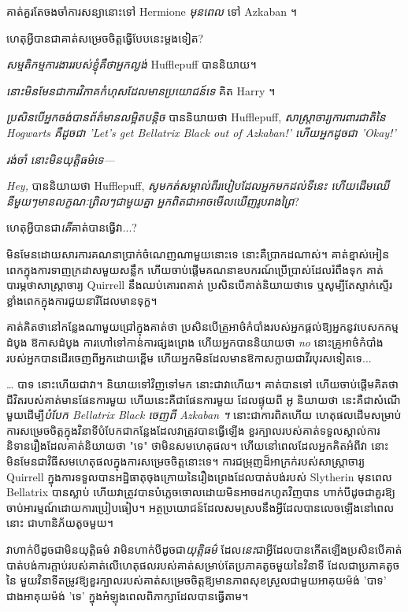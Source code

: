 {{{{{{{គាត់គួរតែចងចាំការសន្យានោះទៅ Hermione \emph{មុនពេល} ទៅ Azkaban ។

ហេតុអ្វីបានជាគាត់សម្រេចចិត្តធ្វើបែបនេះម្តងទៀត?

\emph{សម្មតិកម្មការងាររបស់ខ្ញុំគឺថាអ្នកល្ងង់} Hufflepuff បាននិយាយ។

\emph{នោះមិនមែនជាការវិភាគកំហុសដែលមានប្រយោជន៍ទេ} គិត Harry ។

\emph{ប្រសិនបើអ្នកចង់បានព័ត៌មានលម្អិតបន្តិច} បាននិយាយថា Hufflepuff, \emph{សាស្រ្តាចារ្យការពារជាតិនៃ Hogwarts គឺដូចជា 'Let's get Bellatrix Black out of Azkaban!' ហើយអ្នកដូចជា 'Okay!'}

\emph{រង់ចាំ \emph{នោះ}មិនយុត្តិធម៌ទេ—}

\emph{Hey,} បាននិយាយថា Hufflepuff, \emph{សូមកត់សម្គាល់ពីរបៀបដែលអ្នកមកដល់ទីនេះ ហើយដើមឈើនីមួយៗមានលក្ខណៈព្រិលៗជាមួយគ្នា អ្នកពិតជាអាចមើលឃើញរូបរាងព្រៃ}?

ហេតុអ្វីបានជា\emph{តើ}គាត់បានធ្វើវា...?

មិន​មែន​ដោយ​សារ​ការ​គណនា​ប្រាក់​ចំណេញ​ណា​មួយ​នោះ​ទេ នោះ​គឺ​ប្រាកដ​ណាស់។ គាត់ខ្មាស់អៀនពេកក្នុងការទាញក្រដាសមួយសន្លឹក ហើយចាប់ផ្តើមគណនាឧបករណ៍ប្រើប្រាស់ដែលរំពឹងទុក គាត់បារម្ភថាសាស្រ្តាចារ្យ Quirrell នឹងឈប់គោរពគាត់ ប្រសិនបើគាត់និយាយថាទេ ឬសូម្បីតែស្ទាក់ស្ទើរខ្លាំងពេកក្នុងការជួយនារីដែលមានទុក្ខ។

គាត់គិតថានៅកន្លែងណាមួយជ្រៅក្នុងគាត់ថា ប្រសិនបើគ្រូអាថ៌កំបាំងរបស់អ្នកផ្តល់ឱ្យអ្នកនូវបេសកកម្មដំបូង ឱកាសដំបូង ការហៅទៅកាន់ការផ្សងព្រេង ហើយអ្នកបាននិយាយថា \emph{no} នោះគ្រូអាថ៌កំបាំងរបស់អ្នកបានដើរចេញពីអ្នកដោយខ្ពើម ហើយអ្នកមិនដែលមានឱកាសក្លាយជាវីរបុរសទៀតទេ...

… បាទ នោះហើយជាវា។ និយាយ​ទៅ​វិញ​ទៅ​មក នោះ​ជា​វា​ហើយ។ គាត់បានទៅ ហើយចាប់ផ្តើមគិតថាជីវិតរបស់គាត់មានផែនការមួយ ហើយនេះគឺជាផែនការមួយ ដែលផ្ទុយពី អូ និយាយថា នេះគឺជាសំណើមួយដើម្បី\emph{បំបែក Bellatrix Black ចេញពី Azkaban ។} នោះជាការពិតហើយ ហេតុផលដើមសម្រាប់ការសម្រេចចិត្តក្នុងវិនាទីបំបែកជាកន្លែងដែលវាត្រូវបានធ្វើឡើង ខួរក្បាលរបស់គាត់ទទួលស្គាល់ការនិទានរឿងដែលគាត់និយាយថា "ទេ" ថាមិនសមហេតុផល។ ហើយនៅពេលដែលអ្នកគិតអំពីវា នោះមិនមែនជាវិធីសមហេតុផលក្នុងការសម្រេចចិត្តនោះទេ។ ការជម្រុញដ៏អាក្រក់របស់សាស្រ្តាចារ្យ Quirrell ក្នុងការទទួលបានអដ្ឋិធាតុចុងក្រោយនៃរឿងព្រេងដែលបាត់បង់របស់ Slytherin មុនពេល Bellatrix បានស្លាប់ ហើយវាត្រូវបានបំភ្លេចចោលដោយមិនអាចដកហូតវិញបាន ហាក់បីដូចជាគួរឱ្យចាប់អារម្មណ៍ដោយការប្រៀបធៀប។ អត្ថប្រយោជន៍ដែលសមស្របនឹងអ្វីដែលបានលេចឡើងនៅពេលនោះ ជាហានិភ័យតូចមួយ។

វាហាក់បីដូចជាមិនយុត្តិធម៌ វាមិនហាក់បីដូចជា\emph{យុត្តិធម៌} ដែល\emph{នេះ}ជាអ្វីដែលបានកើតឡើងប្រសិនបើគាត់បាត់បង់ការក្តាប់របស់គាត់លើហេតុផលរបស់គាត់សម្រាប់តែប្រភាគតូចមួយនៃវិនាទី ដែលជាប្រភាគតូចនៃ មួយវិនាទីតម្រូវឱ្យខួរក្បាលរបស់គាត់សម្រេចចិត្តឱ្យមានភាពសុខស្រួលជាមួយអាគុយម៉ង់ 'បាទ' ជាងអាគុយម៉ង់ 'ទេ' ក្នុងអំឡុងពេលពិភាក្សាដែលបានធ្វើតាម។

}}}}}}}
